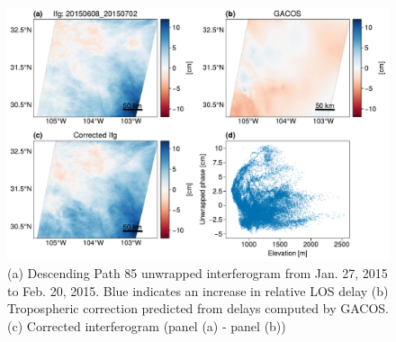 \begin{figure}
	\centering
	\includegraphics[width=1.0\textwidth]{figures/chapter2-sar/figure_tropo_correct_gacos_20150608_20150702.pdf}
	\caption[GACOS tropospheric correction]{
		(a) Descending Path 85 unwrapped interferogram from Jan. 27, 2015 to Feb. 20, 2015. Blue indicates an increase in relative LOS delay
		(b) Tropospheric correction predicted from delays computed by GACOS.
		(c) Corrected interferogram (panel (a) - panel (b))
	}
	\label{fig:ch2-tropo-correct-gacos-fail}
\end{figure}




